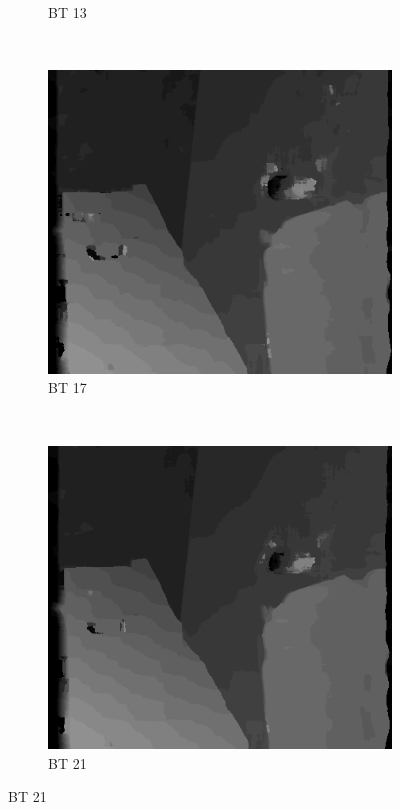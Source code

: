\begin{figure}
\begin{subfigure}[b]{0.23\textwidth}
    \caption{BT 13}
  \end{subfigure}
  ~
  \begin{subfigure}[b]{0.23\textwidth}
    \centering
    \includegraphics[width=\textwidth]{images/stereo-pairs/venus_bt_17.png}
    \caption{BT 17}
  \end{subfigure}
  ~
  \begin{subfigure}[b]{0.23\textwidth}
    \centering
    \includegraphics[width=\textwidth]{images/stereo-pairs/venus_bt_21.png}
    \caption{BT 21}
  \end{subfigure}


\end{figure}
